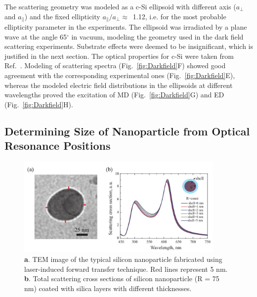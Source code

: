            The scattering geometry was modeled as a c-Si ellipsoid with different axis
        ($a_{\perp}$ and $a_{||}$) and the fixed ellipticity $a_{\parallel}/a_{\perp}\approx$~1.12, i.e. for
        the most probable ellipticity parameter in the experiments. The ellipsoid was irradiated by a plane wave
        at the angle 65$^{\circ}$ in vacuum, modeling the geometry used in the dark field scattering experiments. Substrate effects
        were deemed to be insignificant, which is justified in the next section. The optical properties for
        c-Si were taken from Ref.~\cite{vuye1993temperature}. Modeling of scattering spectra (Fig.~\ref{fig:Darkfield}F) showed good agreement
        with the corresponding experimental ones (Fig.~\ref{fig:Darkfield}E), whereas the modeled electric field distributions
        in the ellipsoids at different wavelengths proved the excitation of MD (Fig.~\ref{fig:Darkfield}G) and ED (Fig.~\ref{fig:Darkfield}H).

    \subsection{Determining Size of Nanoparticle from Optical Resonance Positions}

        \begin{figure}[!ht]
                \begin{center}
                    \includegraphics[width=0.9\textwidth]{figs/results/char/CoreShell.jpg}
                \end{center}
                \caption{\textbf{a}. TEM image of the typical silicon nanoparticle fabricated using laser-induced
                            forward transfer technique. Red lines represent 5 nm. \textbf{b}. Total scattering cross sections of
                            silicon nanoparticle (R = 75 nm) coated with silica layers with different thicknesses.}
                \label{fig:CoreShell}
        \end{figure}

